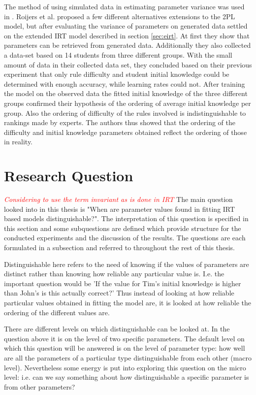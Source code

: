 \documentclass{scrartcl}
\newcommand\todo[1]{\textit{\textcolor{red}{#1}}}
\begin{document}
The method of using simulated data in estimating parameter variance was used in \cite{eirt}. Roijers et al. proposed a few different alternatives extensions to the 2PL model, but after evaluating the variance of parameters on generated data settled on the extended IRT model described in section \ref{sec:eirt}. At first they show that parameters can be retrieved from generated data. Additionally they also collected a data-set based on 14 students from three different groups. With the small amount of data in their collected data set, they concluded based on their previous experiment that only rule difficulty and student initial knowledge could be determined with enough accuracy, while learning rates could not. After training the model on the observed data the fitted initial knowledge of the three different groups confirmed their hypothesis of the ordering of average initial knowledge per group. Also the ordering of difficulty of the rules involved is indistinguishable to rankings made by experts. The authors thus showed that the ordering of the difficulty and initial knowledge parameters obtained reflect the ordering of those in reality.

\section{Research Question}
\label{sec:RQ}
\todo{Considering to use the term invariant as is done in IRT}
The main question looked into in this thesis is "When are parameter values found in fitting IRT based models distinguishable?". The interpretation of this question is specified in this section and some subquestions are defined which provide structure for the conducted experiments and the discussion of the results. The questions are each formulated in a subsection and referred to throughout the rest of this thesis.

Distinguishable here refers to the need of knowing if the values of parameters are distinct rather than knowing how reliable any particular value is. I.e. the important question would be 'If the value for Tim's initial knowledge is higher than John's is this actually correct?' Thus instead of looking at how reliable particular values obtained in fitting the model are, it is looked at how reliable the ordering of the different values are.

There are different levels on which distinguishable can be looked at. In the question above it is on the level of two specific parameters. The default level on which this question will be answered is on the level of parameter type: how well are all the parameters of a particular type distinguishable from each other (macro level). Nevertheless some energy is put into exploring this question on the micro level: i.e. can we say something about how distinguishable a specific parameter is from other parameters?
\end{document}
